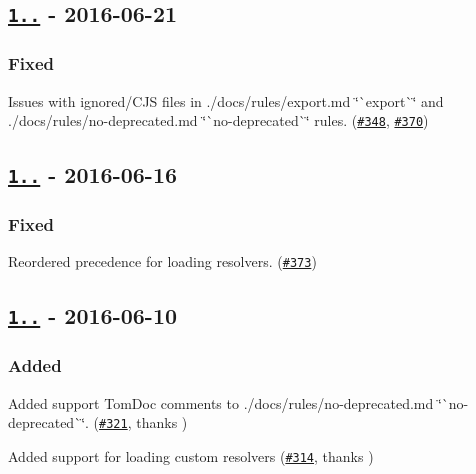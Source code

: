 \subsection*{\href{https://github.com/benmosher/eslint-plugin-import/compare/v1.9.1...v1.9.2}{\tt 1..} -\/ 2016-\/06-\/21}

\subsubsection*{Fixed}


\begin{DoxyItemize}
\item Issues with ignored/\+C\+JS files in ./docs/rules/export.md \char`\"{}\`{}export\`{}\char`\"{} and ./docs/rules/no-\/deprecated.md \char`\"{}\`{}no-\/deprecated\`{}\char`\"{} rules. (\href{https://github.com/benmosher/eslint-plugin-import/issues/348}{\tt \#348}, \href{https://github.com/benmosher/eslint-plugin-import/issues/370}{\tt \#370})
\end{DoxyItemize}

\subsection*{\href{https://github.com/benmosher/eslint-plugin-import/compare/v1.9.0...v1.9.1}{\tt 1..} -\/ 2016-\/06-\/16}

\subsubsection*{Fixed}


\begin{DoxyItemize}
\item Reordered precedence for loading resolvers. (\href{https://github.com/benmosher/eslint-plugin-import/issues/373}{\tt \#373})
\end{DoxyItemize}

\subsection*{\href{https://github.com/benmosher/eslint-plugin-import/compare/v1.8.1...v1.9.0}{\tt 1..} -\/ 2016-\/06-\/10}

\subsubsection*{Added}


\begin{DoxyItemize}
\item Added support Tom\+Doc comments to ./docs/rules/no-\/deprecated.md \char`\"{}\`{}no-\/deprecated\`{}\char`\"{}. (\href{https://github.com/benmosher/eslint-plugin-import/pull/321}{\tt \#321}, thanks \href{https://github.com/josh}{\tt })
\item Added support for loading custom resolvers (\href{https://github.com/benmosher/eslint-plugin-import/pull/314}{\tt \#314}, thanks \href{https://github.com/le0nik}{\tt })
\end{DoxyItemize}

